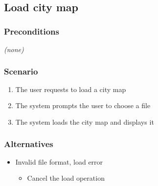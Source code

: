 \subsection{Load city map}\hypertarget{load-city-map}{}\label{load-city-map}

\subsubsection{Preconditions}\hypertarget{preconditions}{}\label{preconditions}

\emph{(none)}

\subsubsection{Scenario}\hypertarget{scenario}{}\label{scenario}

\begin{enumerate}
\item The user requests to load a city map
\item The system prompts the user to choose a file
\item The system loads the city map and displays it
\end{enumerate}

\subsubsection{Alternatives}\hypertarget{alternatives}{}\label{alternatives}

\begin{itemize}
\item Invalid file format, load error


\begin{itemize}
\item Cancel the load operation
\end{itemize}
\end{itemize}
